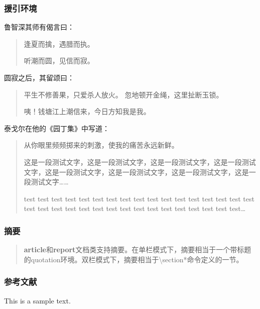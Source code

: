 \documentclass{ctexart}
\begin{document}
        \subsubsection{援引环境}
            鲁智深其师有偈言曰：
            \begin{quote}
                逢夏而擒，遇腊而执。

                听潮而圆，见信而寂。
            \end{quote}

            圆寂之后，其留颂曰：
            \begin{quotation}
                平生不修善果，只爱杀人放火。
                忽地顿开金绳，这里扯断玉锁。

                咦！钱塘江上潮信来，今日方知我是我。
            \end{quotation}

            泰戈尔在他的《园丁集》中写道：
            \begin{verse}
                从你眼里频频掷来的刺激，使我的痛苦永远新鲜。

                这是一段测试文字，这是一段测试文字，这是一段测试文字，这是一段测试文字，这是一段测试文字，这是一段测试文字，这是一段测试文字，这是一段测试文字……

                test test test test test test test test test test test test test test test test test test test test test test test test test test test test test test test test test\ldots
            \end{verse}

        \subsubsection{摘要}
            \renewcommand{\abstractname}{这是摘要} %
            \begin{abstract}
                \textbf{article}和\textbf{report}文档类支持摘要。在单栏模式下，摘要相当于一个带标题的quotation环境。双栏模式下，摘要相当于\textbackslash section*命令定义的一节。
            \end{abstract}
        
        \subsubsection{参考文献}
            This is a sample text.\cite{author1.year1,author2.year2}
\end{document}
